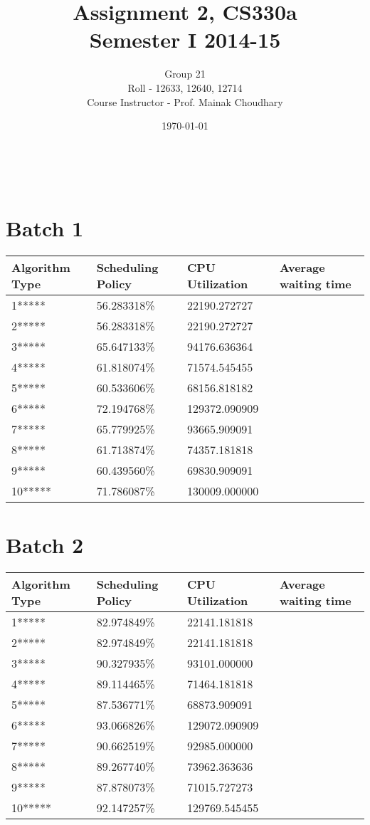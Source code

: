 \documentclass[]{article}
\title{Assignment 2, CS330a \\
	Semester I 2014-15 \\
}
\author{Group 21\\
      Roll - 12633, 12640, 12714\\
      Course Instructor - Prof. Mainak Choudhary \\
	       }
\date{\today}
\theoremstyle{definition}
\begin{document}
\maketitle
\hrulefill \\

\section{Batch 1} 
 \begin{adjustwidth}{-2.8cm}{} 
\begin{tabular}{|l|l|l|l|} 
\hline 
Algorithm Type & Scheduling Policy & CPU Utilization & Average waiting time \\ 
\hline 
1***** & 56.283318\% & 22190.272727 \\ 
 \hline 
2***** & 56.283318\% & 22190.272727 \\ 
 \hline 
3***** & 65.647133\% & 94176.636364 \\ 
 \hline 
4***** & 61.818074\% & 71574.545455 \\ 
 \hline 
5***** & 60.533606\% & 68156.818182 \\ 
 \hline 
6***** & 72.194768\% & 129372.090909 \\ 
 \hline 
7***** & 65.779925\% & 93665.909091 \\ 
 \hline 
8***** & 61.713874\% & 74357.181818 \\ 
 \hline 
9***** & 60.439560\% & 69830.909091 \\ 
 \hline 
10***** & 71.786087\% & 130009.000000 \\ 
 \hline 
\end{tabular}
\end{adjustwidth}

\section{Batch 2} 
 \begin{adjustwidth}{-2.8cm}{} 
\begin{tabular}{|l|l|l|l|} 
\hline 
Algorithm Type & Scheduling Policy & CPU Utilization & Average waiting time \\ 
\hline 
1***** & 82.974849\% & 22141.181818 \\ 
 \hline 
2***** & 82.974849\% & 22141.181818 \\ 
 \hline 
3***** & 90.327935\% & 93101.000000 \\ 
 \hline 
4***** & 89.114465\% & 71464.181818 \\ 
 \hline 
5***** & 87.536771\% & 68873.909091 \\ 
 \hline 
6***** & 93.066826\% & 129072.090909 \\ 
 \hline 
7***** & 90.662519\% & 92985.000000 \\ 
 \hline 
8***** & 89.267740\% & 73962.363636 \\ 
 \hline 
9***** & 87.878073\% & 71015.727273 \\ 
 \hline 
10***** & 92.147257\% & 129769.545455 \\ 
 \hline 
\end{tabular}
\end{adjustwidth}
\end{document}
